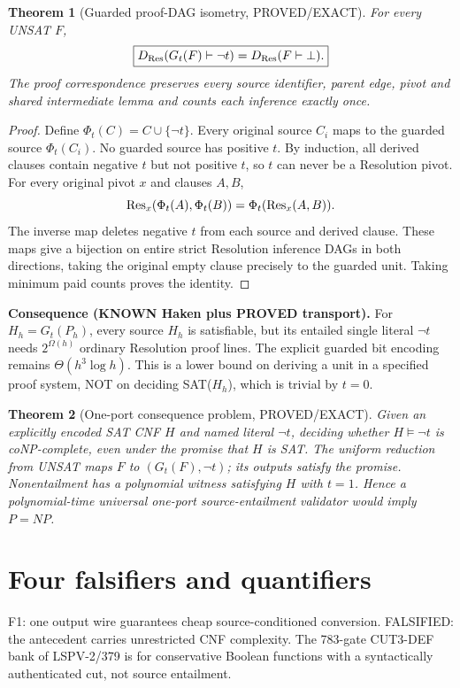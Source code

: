 \documentclass[11pt]{article}
\newtheorem{theorem}{Theorem}
\begin{document}
\begin{theorem}[Guarded proof-DAG isometry, PROVED/EXACT]
For every UNSAT $F$,
\[
\boxed{D_{\rm Res}(G_t(F)\vdash\neg t)=D_{\rm Res}(F\vdash\bot).}
\]
The proof correspondence preserves every source identifier, parent edge, pivot and shared intermediate lemma and counts each inference exactly once.
\end{theorem}
\begin{proof}
Define $\Phi_t(C)=C\cup\{\neg t\}$. Every original source $C_i$ maps to the guarded source $\Phi_t(C_i)$. No guarded source has positive $t$. By induction, all derived clauses contain negative $t$ but not positive $t$, so $t$ can never be a Resolution pivot. For every original pivot $x$ and clauses $A,B$,
\[
{\rm Res}_x(\Phi_t(A),\Phi_t(B))=\Phi_t({\rm Res}_x(A,B)).
\]
The inverse map deletes negative $t$ from each source and derived clause. These maps give a bijection on entire strict Resolution inference DAGs in both directions, taking the original empty clause precisely to the guarded unit. Taking minimum paid counts proves the identity.
\end{proof}

\noindent\textbf{Consequence (KNOWN Haken plus PROVED transport).} For $H_h=G_t(P_h)$, every source $H_h$ is satisfiable, but its entailed single literal $\neg t$ needs $2^{\Omega(h)}$ ordinary Resolution proof lines. The explicit guarded bit encoding remains $\Theta(h^3\log h)$. This is a lower bound on deriving a unit in a specified proof system, NOT on deciding SAT($H_h$), which is trivial by $t=0$.

\begin{theorem}[One-port consequence problem, PROVED/EXACT]
Given an explicitly encoded SAT CNF $H$ and named literal $\neg t$, deciding whether $H\models\neg t$ is coNP-complete, even under the promise that $H$ is SAT. The uniform reduction from UNSAT maps $F$ to $(G_t(F),\neg t)$; its outputs satisfy the promise. Nonentailment has a polynomial witness satisfying $H$ with $t=1$. Hence a polynomial-time universal one-port source-entailment validator would imply $P=NP$.
\end{theorem}

\section*{Four falsifiers and quantifiers}
\noindent F1: one output wire guarantees cheap source-conditioned conversion. FALSIFIED: the antecedent carries unrestricted CNF complexity. The 783-gate CUT3-DEF bank of LSPV-2/379 is for conservative Boolean functions with a syntactically authenticated cut, not source entailment.
\end{document}
